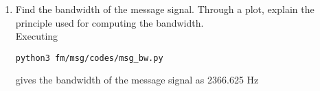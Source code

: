 \begin{enumerate}[label=\arabic*.,ref=\thesection.\theenumi]
\item Find the bandwidth of the message signal. Through a plot, explain the principle used for computing the bandwidth.\\
\solution 
Executing
\begin{lstlisting}
python3 fm/msg/codes/msg_bw.py
\end{lstlisting}
gives the bandwidth of the message signal as 2366.625 Hz
\\
\iffalse
\begin{lstlisting}
/fm/FM/codes/input.py
\end{lstlisting}
\fi

\end{enumerate}
